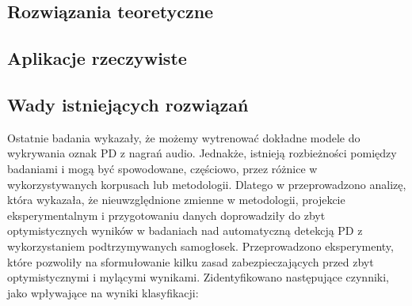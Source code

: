 

\subsection{Rozwiązania teoretyczne}
\label{subsec:rozwiazania-teoretyczne}

\subsection{Aplikacje rzeczywiste}
\label{subsec:aplikacje}


\subsection{Wady istniejących rozwiązań}
\label{subsec:wady_rozwiazan}

Ostatnie badania wykazały, że możemy wytrenować dokładne modele do wykrywania oznak PD z nagrań audio.
Jednakże, istnieją rozbieżności pomiędzy badaniami i mogą być spowodowane, częściowo, przez różnice w
wykorzystywanych korpusach lub metodologii.
Dlatego w\cite{SustainedVowelsProblems} przeprowadzono analizę, która wykazała, że nieuwzględnione zmienne w metodologii,
projekcie eksperymentalnym i przygotowaniu danych doprowadziły do zbyt optymistycznych wyników w badaniach nad
automatyczną detekcją PD z wykorzystaniem podtrzymywanych samogłosek.
Przeprowadzono eksperymenty, które pozwoliły na sformułowanie kilku zasad zabezpieczających przed zbyt
optymistycznymi i mylącymi wynikami.
Zidentyfikowano następujące czynniki, jako wpływające na wyniki klasyfikacji:


